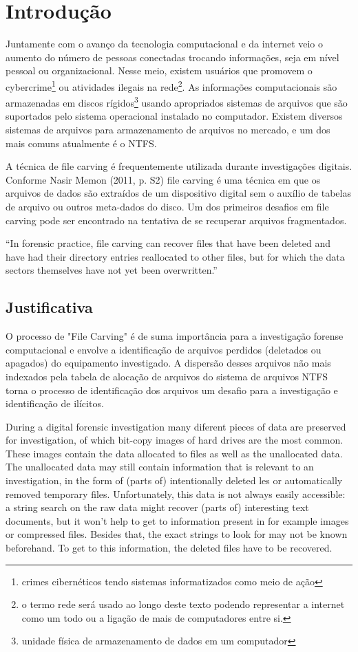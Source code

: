 \chapter{Introdução}
Juntamente com o avanço da tecnologia computacional e da internet veio o aumento do número de pessoas conectadas trocando informações, seja em nível pessoal ou organizacional. Nesse meio, existem usuários que promovem o cybercrime\footnote{crimes cibernéticos tendo sistemas informatizados como meio de ação} ou atividades ilegais na rede\footnote{o termo rede será usado ao longo deste texto podendo representar a internet como um todo ou a ligação de mais de computadores entre si.}. As informações computacionais são armazenadas em discos rígidos\footnote{unidade física de armazenamento de dados em um computador} usando apropriados sistemas de arquivos que são suportados pelo sistema operacional instalado no computador. Existem diversos sistemas de arquivos para armazenamento de arquivos no mercado, e um dos mais comuns atualmente é o NTFS. \cite{iracst}

A técnica de file carving é frequentemente utilizada durante investigações digitais. Conforme Nasir Memon (2011, p. S2) file carving é uma técnica em que os arquivos de dados são extraídos de um dispositivo digital sem o auxílio de tabelas de arquivo ou outros meta-dados do disco. Um dos primeiros desafios em file carving pode ser encontrado na tentativa de se recuperar arquivos fragmentados.

``In forensic practice, file carving can recover files that have been deleted and have had their directory entries reallocated to other files, but for which the data sectors themselves have not yet been overwritten.'' \cite{digitalinvestigation}

\section{Justificativa}
O processo de "File Carving" é de suma importância para a investigação forense computacional e envolve a identificação de arquivos perdidos (deletados ou apagados) do equipamento investigado. A dispersão desses arquivos não mais indexados pela tabela de alocação de arquivos do sistema de arquivos NTFS torna o processo de identificação dos arquivos um desafio para a investigação e identificação de ilícitos.
\begin{citacao}
During a digital forensic investigation many diferent pieces of data are preserved for investigation, of which bit-copy images of hard drives are the most common. These images contain the data allocated to files as well as the unallocated data. The unallocated data may still contain information that is relevant to an investigation, in the form of (parts of) intentionally deleted les or automatically removed temporary files. Unfortunately, this data is not always easily accessible: a string search on the raw data might recover (parts of) interesting text documents, but it won't help to get to information present in for example images or compressed files. Besides that, the exact strings to look for may not be known beforehand. To get to this information, the deleted files have to be recovered. \cite{eindhoven}
\end{citacao}

